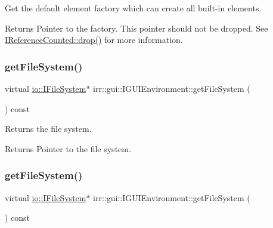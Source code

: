 Get the default element factory which can create all built-\/in elements. 

\begin{DoxyReturn}{Returns}
Pointer to the factory. This pointer should not be dropped. See \hyperlink{classirr_1_1IReferenceCounted_a03856a09355b89d178090c4a5f738543}{I\+Reference\+Counted\+::drop()} for more information. 
\end{DoxyReturn}
\mbox{\label{classirr_1_1gui_1_1IGUIEnvironment_ad3ae4570702000e09cacdb663f0ec363}} 
\subsubsection{\texorpdfstring{get\+File\+System()}{getFileSystem()}\hspace{0.1cm}{\footnotesize\ttfamily [1/2]}}
{\footnotesize\ttfamily virtual \hyperlink{classirr_1_1io_1_1IFileSystem}{io\+::\+I\+File\+System}$\ast$ irr\+::gui\+::\+I\+G\+U\+I\+Environment\+::get\+File\+System (\begin{DoxyParamCaption}{ }\end{DoxyParamCaption}) const\hspace{0.3cm}{\ttfamily [pure virtual]}}



Returns the file system. 

\begin{DoxyReturn}{Returns}
Pointer to the file system. 
\end{DoxyReturn}
\mbox{\label{classirr_1_1gui_1_1IGUIEnvironment_ad3ae4570702000e09cacdb663f0ec363}} 
\subsubsection{\texorpdfstring{get\+File\+System()}{getFileSystem()}\hspace{0.1cm}{\footnotesize\ttfamily [2/2]}}
{\footnotesize\ttfamily virtual \hyperlink{classirr_1_1io_1_1IFileSystem}{io\+::\+I\+File\+System}$\ast$ irr\+::gui\+::\+I\+G\+U\+I\+Environment\+::get\+File\+System (\begin{DoxyParamCaption}{ }\end{DoxyParamCaption}) const\hspace{0.3cm}{\ttfamily [pure virtual]}}



